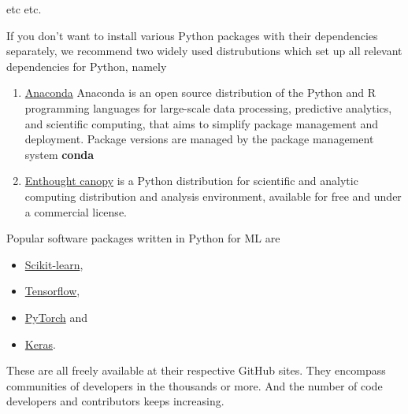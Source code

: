 \documentclass[%
oneside,                 %
final,                   %
10pt]{article}
\begin{document}
\noindent
etc etc. 

If you don't want to install various Python packages with their dependencies separately, we recommend two widely used distrubutions which set up  all relevant dependencies for Python, namely
\begin{enumerate}
\item \href{{https://docs.anaconda.com/}}{Anaconda} Anaconda is an open source distribution of the Python and R programming languages for large-scale data processing, predictive analytics, and scientific computing, that aims to simplify package management and deployment. Package versions are managed by the package management system \textbf{conda}

\item \href{{https://www.enthought.com/product/canopy/}}{Enthought canopy}  is a Python distribution for scientific and analytic computing distribution and analysis environment, available for free and under a commercial license.
\end{enumerate}

\noindent
Popular software packages written in Python for ML are

\begin{itemize}
\item \href{{http://scikit-learn.org/stable/}}{Scikit-learn}, 

\item \href{{https://www.tensorflow.org/}}{Tensorflow},

\item \href{{http://pytorch.org/}}{PyTorch} and 

\item \href{{https://keras.io/}}{Keras}.
\end{itemize}

\noindent
These are all freely available at their respective GitHub sites. They 
encompass communities of developers in the thousands or more. And the number
of code developers and contributors keeps increasing.













\end{document}
